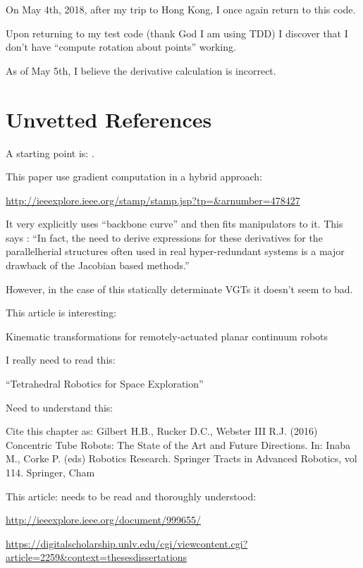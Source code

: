 \documentclass[11pt]{article}
\begin{document}
On May 4th, 2018, after my trip to Hong Kong, I once again return to this code.

Upon returning to my test code (thank God I am using TDD) I discover that I don't have ``compute rotation about points'' working.

As of May 5th, I believe the derivative calculation is incorrect.


\section{Unvetted References}

A starting point is: \cite{Hanahara2008}.

This paper use gradient computation in a hybrid approach:

\url{http://ieeexplore.ieee.org/stamp/stamp.jsp?tp=&arnumber=478427}

It very explicitly uses ``backbone curve'' and then fits manipulators to it.
This says :  ``In fact, the need to derive expressions for these
derivatives for the parallelherial structures often used in real
hyper-redundant systems is a major drawback of the Jacobian
based methods.''

However, in the case of this statically determinate VGTs it doesn't seem to bad.

This article is interesting:

Kinematic transformations for remotely-actuated planar continuum robots

I really need to read this:

``Tetrahedral Robotics for Space Exploration''

Need to understand this:

Cite this chapter as:
Gilbert H.B., Rucker D.C., Webster III R.J. (2016) Concentric Tube Robots: The State of the Art and Future Directions. In: Inaba M., Corke P. (eds) Robotics Research. Springer Tracts in Advanced Robotics, vol 114. Springer, Cham

This article: needs to be read and thoroughly understood:

\url{http://ieeexplore.ieee.org/document/999655/}

\url{https://digitalscholarship.unlv.edu/cgi/viewcontent.cgi?article=2259&context=thesesdissertations}



\end{document}
